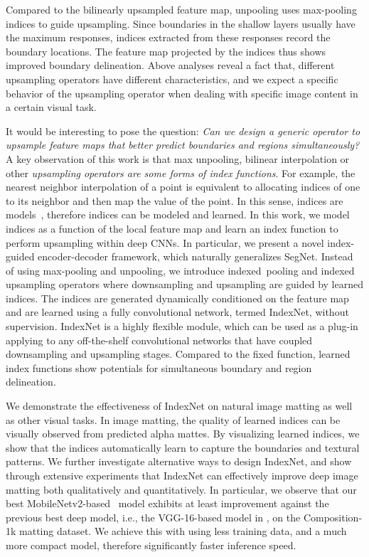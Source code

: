 \documentclass[10pt,twocolumn,letterpaper]{article}
\begin{document}
Compared to the bilinearly upsampled feature map, unpooling uses max-pooling indices to guide upsampling. Since boundaries in the shallow layers usually have the maximum responses, indices extracted from these responses record the boundary locations. The feature map projected by the indices thus shows improved boundary delineation. Above analyses reveal a fact that, different upsampling operators have different characteristics, and we expect a specific behavior of the upsampling operator when dealing with specific image content in a certain visual task.





It would be interesting to pose the question: \textit{Can we design a generic operator to upsample feature maps that better predict boundaries and regions simultaneously?} A key observation of this work is that max unpooling, bilinear interpolation or other \textit{upsampling operators are some forms of index functions}. For example, the nearest neighbor interpolation of a point is equivalent to allocating indices of one to its neighbor and then map the value of the point. In this sense, indices are models~\cite{kraska2018case}, therefore indices can be modeled and learned. In this work, we model indices as a function of the local feature map and learn an index function to perform upsampling within deep CNNs. In particular, we present a novel index-guided encoder-decoder framework, which naturally generalizes SegNet. Instead of using  max-pooling and unpooling, we introduce \mbox{indexed pooling} and indexed upsampling operators where downsampling and upsampling are guided by learned indices. The indices are generated dynamically conditioned on the feature map and are learned using a fully convolutional network, termed IndexNet, without supervision. IndexNet is a highly flexible module, which can be used as a plug-in applying to any off-the-shelf convolutional networks that have coupled downsampling and upsampling stages. Compared to the fixed  function, learned index functions show potentials for simultaneous boundary and region delineation.

We demonstrate the effectiveness of IndexNet on natural image matting as well as other visual tasks. In image matting, the quality of learned indices can be visually observed from predicted alpha mattes. By visualizing learned indices, we show that the indices automatically learn to capture the boundaries and textural patterns.
We further investigate alternative ways to design IndexNet, and show through extensive experiments that IndexNet can effectively improve deep image matting  both qualitatively and quantitatively. In particular, we observe that our best MobileNetv2-based~\cite{sandler2018mobilenetv2} model exhibits at least  improvement against the previous best deep model, i.e., the VGG-16-based model in \cite{xu2017deep}, on the Composition-1k matting dataset.  We achieve this with using less training data, and a much more compact model, therefore significantly faster inference speed.
\end{document}
